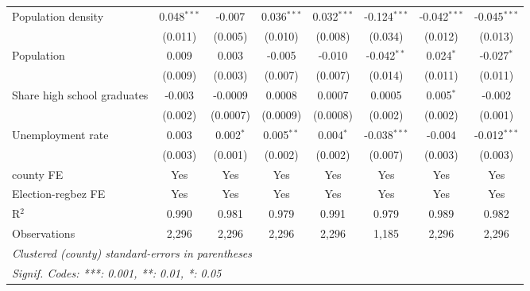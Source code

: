 \begin{table}[htbp]
\begin{tabular}{lccccccc}
      Population density                                      & 0.048$^{***}$        & -0.007                & 0.036$^{***}$         & 0.032$^{***}$  & -0.124$^{***}$ & -0.042$^{***}$ & -0.045$^{***}$\\   
                                                              & (0.011)              & (0.005)               & (0.010)               & (0.008)        & (0.034)        & (0.012)        & (0.013)\\   
      Population                                              & 0.009                & 0.003                 & -0.005                & -0.010         & -0.042$^{**}$  & 0.024$^{*}$    & -0.027$^{*}$\\   
                                                              & (0.009)              & (0.003)               & (0.007)               & (0.007)        & (0.014)        & (0.011)        & (0.011)\\   
      Share high school graduates                             & -0.003               & -0.0009               & 0.0008                & 0.0007         & 0.0005         & 0.005$^{*}$    & -0.002\\   
                                                              & (0.002)              & (0.0007)              & (0.0009)              & (0.0008)       & (0.002)        & (0.002)        & (0.001)\\   
      Unemployment rate                                       & 0.003                & 0.002$^{*}$           & 0.005$^{**}$          & 0.004$^{*}$    & -0.038$^{***}$ & -0.004         & -0.012$^{***}$\\   
                                                              & (0.003)              & (0.001)               & (0.002)               & (0.002)        & (0.007)        & (0.003)        & (0.003)\\   
      county FE                                               & Yes                  & Yes                   & Yes                   & Yes            & Yes            & Yes            & Yes\\  
      Election-regbez FE                                      & Yes                  & Yes                   & Yes                   & Yes            & Yes            & Yes            & Yes\\  
      R$^2$                                                   & 0.990                & 0.981                 & 0.979                 & 0.991          & 0.979          & 0.989          & 0.982\\  
      Observations                                            & 2,296                & 2,296                 & 2,296                 & 2,296          & 1,185          & 2,296          & 2,296\\  
      \midrule \midrule
      \multicolumn{8}{l}{\emph{Clustered (county) standard-errors in parentheses}}\\
      \multicolumn{8}{l}{\emph{Signif. Codes: ***: 0.001, **: 0.01, *: 0.05}}\\
   \end{tabular}
\end{table}



